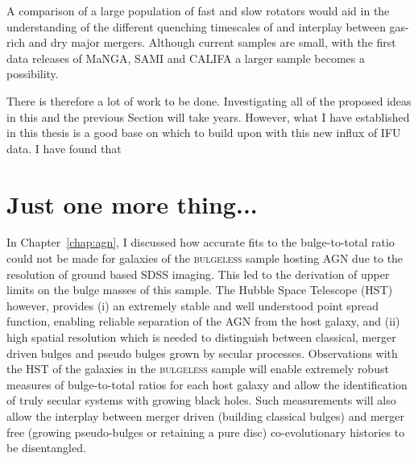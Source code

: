 A comparison of a large population of fast and slow rotators would aid in the understanding of the different quenching timescales of and interplay between gas-rich and dry major mergers. Although current samples are small, with the first data releases of MaNGA, SAMI and CALIFA a larger sample becomes a possibility. 

There is therefore a lot of work to be done. Investigating all of the proposed ideas in this and the previous Section will take years. However, what I have established in this thesis is a good base on which to build upon with this new influx of IFU data. I have found that

\section{Just one more thing...}\label{sec:hst}

In Chapter~\ref{chap:agn}, I discussed how accurate fits to the bulge-to-total ratio could not be made for galaxies of the \textsc{bulgeless} sample hosting AGN due to the resolution of ground based SDSS imaging. This led to the derivation of upper limits on the bulge masses of this sample. The Hubble Space Telescope (HST) however, provides (i) an extremely stable and well understood point spread function, enabling reliable separation of the AGN from the host galaxy, and (ii) high spatial resolution which is needed to distinguish between classical, merger driven bulges and pseudo bulges grown by secular processes. Observations with the HST of the galaxies in the \textsc{bulgeless} sample will enable extremely robust measures of bulge-to-total ratios for each host galaxy and allow the identification of truly secular systems with growing black holes. Such measurements will also allow the interplay between merger driven (building classical bulges) and merger free (growing pseudo-bulges or retaining a pure disc) co-evolutionary histories to be disentangled. 

